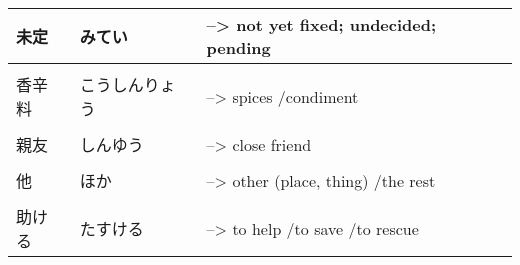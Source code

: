 \documentclass{article}
\begin{document}
\begin{tabular}{ l | l l }
未定				& みてい					&--> not yet fixed; undecided; pending		\\ \hline\\[-1em]
香辛料			& こうしんりょう 				&--> spices /condiment						\\ \hline\\[-1em]
親友				& しんゆう					&--> close friend							\\ \hline\\[-1em]
他				& ほか					&--> other (place, thing) /the rest			\\ \hline\\[-1em]
助ける			& たすける					&--> to help /to save /to rescue

\end{tabular}
\end{document}
